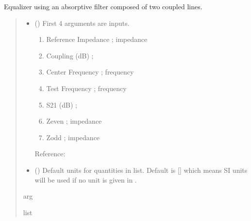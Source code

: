 \documentclass[letterpaper,10pt,english]{sphinxmanual}
\begin{document}
\begin{fulllineitems}
\label{\detokenize{components:components.Absorptive_Filter_Equalizer}}
\pysigstartsignatures
{}
\pysigstopsignatures
\sphinxAtStartPar
Equalizer using an absorptive filter composed of two coupled lines.
\begin{quote}\begin{description}
\begin{itemize}
\item {}
\sphinxAtStartPar
{} () \textendash{}
\sphinxAtStartPar
First 4 arguments are inputs.
\begin{enumerate}
%
\item {}
\sphinxAtStartPar
Reference Impedance ; impedance

\item {}
\sphinxAtStartPar
Coupling (dB) ;

\item {}
\sphinxAtStartPar
Center Frequency ; frequency

\item {}
\sphinxAtStartPar
Test Frequency ; frequency

\item {}
\sphinxAtStartPar
S21 (dB) ;

\item {}
\sphinxAtStartPar
Zeven ;  impedance

\item {}
\sphinxAtStartPar
Zodd ;  impedance

\end{enumerate}

\sphinxAtStartPar
Reference:


\item {}
\sphinxAtStartPar
{} (\sphinxstyleliteralemphasis{\sphinxupquote{, }}) \textendash{} Default units for quantities in  list. Default is {[}{]} which means SI units will be used if no unit is given in .

\end{itemize}

\sphinxAtStartPar
arg

\sphinxAtStartPar
list

\end{description}\end{quote}

\end{fulllineitems}
\end{document}
